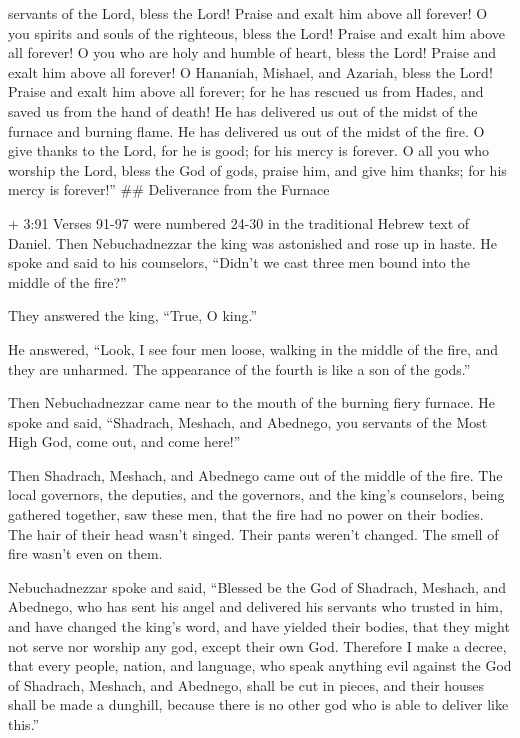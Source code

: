 servants of the Lord, bless the Lord! Praise and exalt him above all
forever!  O you spirits and souls of the righteous, bless
the Lord! Praise and exalt him above all forever!  O you
who are holy and humble of heart, bless the Lord! Praise and exalt him
above all forever!  O Hananiah, Mishael, and Azariah, bless
the Lord! Praise and exalt him above all forever; for he has rescued us
from Hades, and saved us from the hand of death! He has delivered us out
of the midst of the furnace and burning flame. He has delivered us out
of the midst of the fire.  O give thanks to the Lord, for
he is good; for his mercy is forever.  O all you who
worship the Lord, bless the God of gods, praise him, and give him
thanks; for his mercy is forever!'' \#\# Deliverance from the Furnace

 + 3:91 Verses 91-97 were numbered 24-30 in the traditional
Hebrew text of Daniel. Then Nebuchadnezzar the king was astonished and
rose up in haste. He spoke and said to his counselors, ``Didn't we cast
three men bound into the middle of the fire?''

They answered the king, ``True, O king.''

 He answered, ``Look, I see four men loose, walking in the
middle of the fire, and they are unharmed. The appearance of the fourth
is like a son of the gods.''

 Then Nebuchadnezzar came near to the mouth of the burning
fiery furnace. He spoke and said, ``Shadrach, Meshach, and Abednego, you
servants of the Most High God, come out, and come here!''

Then Shadrach, Meshach, and Abednego came out of the middle of the fire.
 The local governors, the deputies, and the governors, and
the king's counselors, being gathered together, saw these men, that the
fire had no power on their bodies. The hair of their head wasn't singed.
Their pants weren't changed. The smell of fire wasn't even on them.

 Nebuchadnezzar spoke and said, ``Blessed be the God of
Shadrach, Meshach, and Abednego, who has sent his angel and delivered
his servants who trusted in him, and have changed the king's word, and
have yielded their bodies, that they might not serve nor worship any
god, except their own God.  Therefore I make a decree, that
every people, nation, and language, who speak anything evil against the
God of Shadrach, Meshach, and Abednego, shall be cut in pieces, and
their houses shall be made a dunghill, because there is no other god who
is able to deliver like this.''

